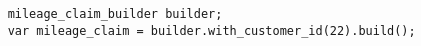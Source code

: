 \begin{verbatim}
    mileage_claim_builder builder;
    var mileage_claim = builder.with_customer_id(22).build();
\end{verbatim}
